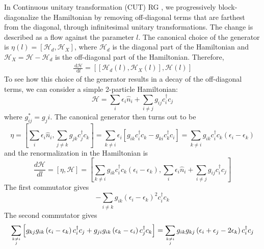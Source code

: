 In Continuous unitary transformation (CUT) RG \cite{glazek1993renormalization}, we progressively block-diagonalize the Hamiltonian by removing off-diagonal terms that are farthest from the diagonal, through infinitesimal unitary transformations. The change is described as a flow against the parameter \(l\). The canonical choice of the generator is \(\eta(l) = \left[\mathcal{H}_d,\mathcal{H}_X\right]\), where \(\mathcal{H}_d\) is the diagonal part of the Hamiltonian and \(\mathcal{H}_X = \mathcal{H} - \mathcal{H}_d\) is the off-diagonal part of the Hamiltonian. Therefore,
\begin{equation}\begin{aligned}
	\label{cut}
	\frac{\:\mathrm{d}\mathcal{H}}{\:\mathrm{d}l} = \left[\left[\mathcal{H}_d(l),\mathcal{H}_X(l)\right],\mathcal{H}(l)\right]
\end{aligned}\end{equation}
To see how this choice of the generator results in a decay of the off-diagonal terms, we can consider a simple 2-particle Hamiltonian:
\begin{equation}
	\mathcal{H} = \sum_i \epsilon_i \hat n_i + \sum_{i\neq j} g_{ij}c^\dagger_i c_j
\end{equation}
where \(g_{ij}^* = g_ji\). The canonical generator then turns out to be 
\begin{equation}
	\eta = \left[\sum_i \epsilon_i \hat n_i, \sum_{j\neq k} g_{jk}c^\dagger_j c_k\right] = \sum_{k\neq i} \epsilon_i\left[g_{ik}c^\dagger_i c_k - g_{ki}c^\dagger_k c_i\right] = \sum_{k\neq i} g_{ik}c^\dagger_i c_k \left(\epsilon_i - \epsilon_k\right)
\end{equation}
and the renormalization in the Hamiltonian is
\begin{equation}
	\frac{d\mathcal{H}}{dl} = \left[\eta, \mathcal{H}\right] = \left[\sum_{k\neq i} g_{ik}c^\dagger_i c_k \left(\epsilon_i - \epsilon_k\right), \sum_i \epsilon_i \hat n_i + \sum_{i\neq j} g_{ij}c^\dagger_i c_j\right]
\end{equation}
The  first commutator gives 
\begin{equation}
	-\sum_{i\neq k} g_{ik}\left(\epsilon_i - \epsilon_k\right)^2 c^\dagger_i c_k
\end{equation}
The second commutator gives
\begin{equation}
	\sum_{k\neq i\atop{j}}\left[g_{kj}g_{ik}\left(\epsilon_i - \epsilon_k\right) c^\dagger_i c_j + g_{ji}g_{ik}\left( \epsilon_k - \epsilon_i \right) c^\dagger_j c_k\right] = \sum_{k\neq i\atop{j}}g_{ik}g_{kj}\left( \epsilon_i + \epsilon_j - 2\epsilon_k \right) c^\dagger_i c_j
\end{equation}
